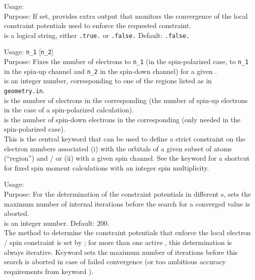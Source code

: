 {
  \noindent
  Usage:   \\[1.0ex]
  Purpose: If set, provides extra output that monitors the convergence
    of the local constraint potentials used to enforce the requested
    constraint. \\[1.0ex]
   is a logical string, either \texttt{.true.} or
  \texttt{.false.} Default: \texttt{.false.} \\
}

{
  \noindent 
  Usage:   \texttt{n\_1}
    [\texttt{n\_2}] \\[1.0ex]
  Purpose: Fixes the number of electrons to \texttt{n\_1} (in the
    spin-polarized case, to \texttt{n\_1} in the spin-up channel and
    \texttt{n\_2} in the spin-down channel) for a given
    . \\[1.0ex]
   is an integer number, corresponding to one of the
    regions listed as  in
    \texttt{geometry.in}. \\
   is the number of electrons in the corresponding
     (the number of spin-up electrons in the case of a
    spin-polarized calculation). \\
   is the number of spin-down electrons in the
    corresponding  (only needed in the spin-polarized
    case). \\
}
This is the central keyword that can be used to define a strict
constraint on the electron numbers associated (i) with the orbitals of a
given subset of atoms (``region'') and / or (ii) with a given spin channel.
See the  keyword for a shortcut for fixed spin
moment calculations with an integer spin multiplicity. 

{
  Usage:   \\[1.0ex]
  Purpose: For the determination of the constraint potentials in
    different s, sets the maximum number
    of internal iterations before the search for a converged value is
    aborted. \\[1.0ex]
   is an integer number. Default: 200. \\
}
The method to determine the constraint potentials that enforce the
local electron / spin constraint is set by ;
for more than one active , this
determination is always iterative. Keyword
 sets the maximum number of iterations
before this search is aborted in case of failed convergence (or too
ambitious accuracy requirements from keyword
). 

